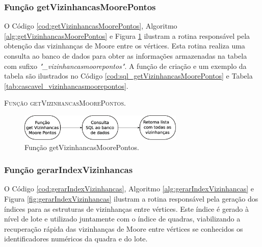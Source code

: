 \newpage

\subsubsection{Função getVizinhancasMoorePontos}

O Código \ref{cod:getVizinhancasMoorePontos}, Algoritmo \ref{alg:getVizinhancasMoorePontos} e Figura \ref{fig:getVizinhancasMoorePontos} ilustram a rotina responsável pela obtenção das vizinhanças de Moore entre os vértices. Esta rotina realiza uma consulta ao banco de dados para obter as informações armazenadas na tabela com sufixo \textit{"\_vizinhancasmoorepontos"}. A função de criação e um exemplo da tabela são ilustrados no Código \ref{cod:sql_getVizinhancasMoorePontos} e Tabela \ref{tab:cascavel_vizinhancasmoorepontos}.  



\begin{algorithm}[H]
   \SetAlgoLined   
   
   \caption{\textsc{Função getVizinhancasMoorePontos.}}
   \label{alg:getVizinhancasMoorePontos}
\end{algorithm}

\begin{figure}[H]
  \centering
  \includegraphics[width=0.7\textwidth]{Figuras/Simula/Fluxos/getVizinhancasMoorePontos.eps}
  \caption{Função getVizinhancasMoorePontos.}
  \label{fig:getVizinhancasMoorePontos}
\end{figure} 

\newpage

\subsubsection{Função gerarIndexVizinhancas}

O Código \ref{cod:gerarIndexVizinhancas}, Algoritmo \ref{alg:gerarIndexVizinhancas} e Figura \ref{fig:gerarIndexVizinhancas} ilustram a rotina responsável pela geração dos índices para as estruturas de vizinhanças entre vértices. Este índice é gerado à nível de lote e utilizado juntamente com o índice de quadras, viabilizando a recuperação rápida das vizinhanças de Moore entre vértices se conhecidos os identificadores numéricos da quadra e do lote. 

